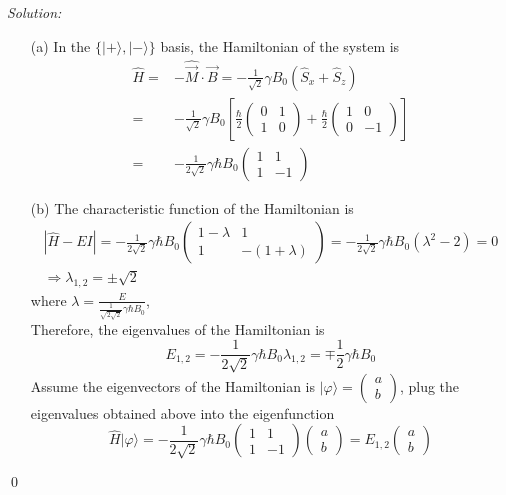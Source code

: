\documentclass[12pt,a4paper]{article}
\newenvironment{sol}
    {\emph{Solution:}
    }
    {
    \qed
    }
\begin{document}
\begin{sol}
\begin{itemize}
\item[(a)] In the $\{|+\rangle,|-\rangle\}$ basis, the Hamiltonian of the system is
\begin{align}
\nonumber\hat{H}=&-\hat{\vec{M}}\cdot\vec{B}=-\frac{1}{\sqrt{2}}\gamma B_0(\hat{S}_x+\hat{S}_z)\\
\nonumber=&-\frac{1}{\sqrt{2}}\gamma B_0\left[\frac{\hbar}{2}\left(\begin{array}{cc}0&1\\1&0\end{array}\right)+\frac{\hbar}{2}\left(\begin{array}{cc}1&0\\0&-1\end{array}\right)\right]\\
=&-\frac{1}{2\sqrt{2}}\gamma\hbar B_0\left(\begin{array}{cc}1&1\\1&-1\end{array}\right)
\end{align}
\item[(b)] The characteristic function of the Hamiltonian is
\begin{gather}
|\hat{H}-EI|=-\frac{1}{2\sqrt{2}}\gamma\hbar B_0\left(\begin{array}{cc}1-\lambda&1\\1&-(1+\lambda)\end{array}\right)=-\frac{1}{2\sqrt{2}}\gamma\hbar B_0(\lambda^2-2)=0\\
\Longrightarrow\lambda_{1,2}=\pm\sqrt{2}
\end{gather}
where $\lambda=\frac{E}{\frac{1}{\sqrt{2\sqrt{2}}}\gamma\hbar B_0}$,\\
Therefore, the eigenvalues of the Hamiltonian is
\begin{equation}
E_{1,2}=-\frac{1}{2\sqrt{2}}\gamma\hbar B_0\lambda_{1,2}=\mp\frac{1}{2}\gamma\hbar B_0
\end{equation}
Assume the eigenvectors of the Hamiltonian is $|\varphi\rangle=\left(\begin{array}{c}a\\b\end{array}\right)$, plug the eigenvalues obtained above into the eigenfunction
\begin{equation}
\hat{H}|\varphi\rangle=-\frac{1}{2\sqrt{2}}\gamma\hbar B_0\left(\begin{array}{cc}1&1\\1&-1\end{array}\right)\left(\begin{array}{c}a\\b\end{array}\right)=E_{1,2}\left(\begin{array}{c}a\\b\end{array}\right)

\end{equation}
\end{itemize}
\end{sol}
\end{document}
